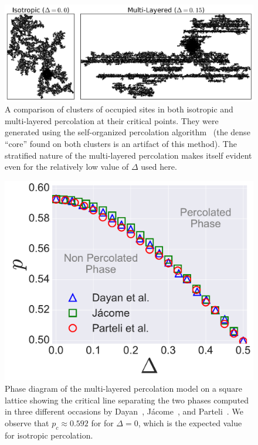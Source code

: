 \begin{figure}
\begin{center}
    \includegraphics[width=\textwidth]{chapters/ch5-anis/figs/mlp_cluster}
\end{center}
\caption{A comparison of clusters of occupied sites in both isotropic and
    multi-layered percolation at their critical points. They were generated
    using the self-organized percolation algorithm~\cite{Parteli2010} (the
    dense ``core'' found on both clusters is an artifact of this method). The
    stratified nature of the multi-layered percolation makes itself evident
    even for the relatively low value of $\Delta$ used here.}
\label{fig:mlp_cluster}
\end{figure}

\begin{figure}
\begin{center}
    \includegraphics[scale=0.4]{chapters/ch5-anis/figs/mlp_ps0}
\end{center}
\caption{Phase diagram of the multi-layered percolation model on a square
    lattice showing the critical line separating the two phases computed in
    three different occasions by Dayan~\cite{Dayan1991},
    J\'acome~\cite{Samyr2009}, and Parteli~\cite{Parteli2010}. We observe that
    $p_c\approx0.592$ for for $\Delta=0$, which is the expected value for
    isotropic percolation.}
\label{fig:mlp_ps0}
\end{figure}


